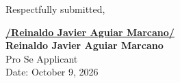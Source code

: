 \documentclass[11pt,letterpaper]{article}
\begin{document}
\vspace{1.0cm}
\begin{singlespace}
\noindent Respectfully submitted, \par\vspace{1.2cm}
\underline{\textbf{/Reinaldo Javier Aguiar Marcano/}} \\
\textbf{Reinaldo Javier Aguiar Marcano} \\
Pro Se Applicant \\
Date: October 9, 2026
\end{singlespace}
\end{document}
